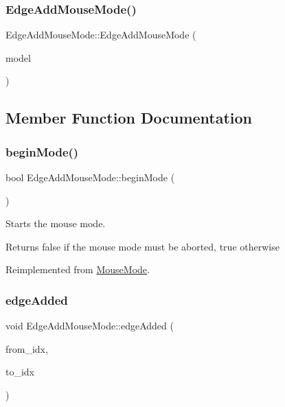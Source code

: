 \subsubsection{\texorpdfstring{EdgeAddMouseMode()}{EdgeAddMouseMode()}}
{\footnotesize\ttfamily Edge\+Add\+Mouse\+Mode\+::\+Edge\+Add\+Mouse\+Mode (\begin{DoxyParamCaption}\item[{\mbox{\hyperlink{class_displace_model}{Displace\+Model}} $\ast$}]{model }\end{DoxyParamCaption})\hspace{0.3cm}{\ttfamily [explicit]}}



\subsection{Member Function Documentation}
\mbox{\label{class_edge_add_mouse_mode_aa6b0ad24f42497d75cc97cb2fae82b76}} 
\subsubsection{\texorpdfstring{beginMode()}{beginMode()}}
{\footnotesize\ttfamily bool Edge\+Add\+Mouse\+Mode\+::begin\+Mode (\begin{DoxyParamCaption}{ }\end{DoxyParamCaption})\hspace{0.3cm}{\ttfamily [virtual]}}



Starts the mouse mode. 

\begin{DoxyReturn}{Returns}
false if the mouse mode must be aborted, true otherwise 
\end{DoxyReturn}


Reimplemented from \mbox{\hyperlink{class_mouse_mode_a32f232953a46467d2fe636df8907bd74}{Mouse\+Mode}}.

\mbox{\label{class_edge_add_mouse_mode_a39e811c29fdaa5355b476c0ddfb6f57f}} 
\subsubsection{\texorpdfstring{edgeAdded}{edgeAdded}}
{\footnotesize\ttfamily void Edge\+Add\+Mouse\+Mode\+::edge\+Added (\begin{DoxyParamCaption}\item[{int}]{from\+\_\+idx,  }\item[{int}]{to\+\_\+idx }\end{DoxyParamCaption})\hspace{0.3cm}{\ttfamily [signal]}}

